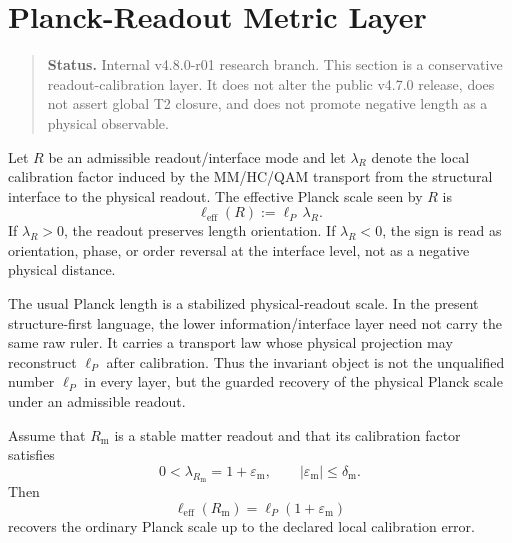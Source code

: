 
\section{Planck-Readout Metric Layer}
\label{sec:v480-r01-planck-readout-metric-layer}

\begin{quote}\small
\noindent\textbf{Status.} Internal v4.8.0-r01 research branch. This section is a
conservative readout-calibration layer. It does not alter the public v4.7.0
release, does not assert global T2 closure, and does not promote negative length
as a physical observable.
\end{quote}

\begin{definition}
Let $R$ be an admissible readout/interface mode and let $\lambda_R$ denote the
local calibration factor induced by the MM/HC/QAM transport from the structural
interface to the physical readout. The effective Planck scale seen by $R$ is
\[
    \ell_{\mathrm{eff}}(R) := \ell_P\,\lambda_R .
\]
If $\lambda_R>0$, the readout preserves length orientation. If $\lambda_R<0$,
the sign is read as orientation, phase, or order reversal at the interface level,
not as a negative physical distance.
\end{definition}

\begin{remark}
The usual Planck length is a stabilized physical-readout scale. In the present
structure-first language, the lower information/interface layer need not carry
the same raw ruler. It carries a transport law whose physical projection may
reconstruct $\ell_P$ after calibration. Thus the invariant object is not the
unqualified number $\ell_P$ in every layer, but the guarded recovery of the
physical Planck scale under an admissible readout.
\end{remark}

\begin{lemma}
Assume that $R_{\mathrm m}$ is a stable matter readout and that its calibration
factor satisfies
\[
    0 < \lambda_{R_{\mathrm m}} = 1 + \varepsilon_{\mathrm m},
    \qquad |\varepsilon_{\mathrm m}| \leq \delta_{\mathrm m} .
\]
Then
\[
    \ell_{\mathrm{eff}}(R_{\mathrm m})
    = \ell_P(1+\varepsilon_{\mathrm m})
\]
recovers the ordinary Planck scale up to the declared local calibration error.
\end{lemma}

